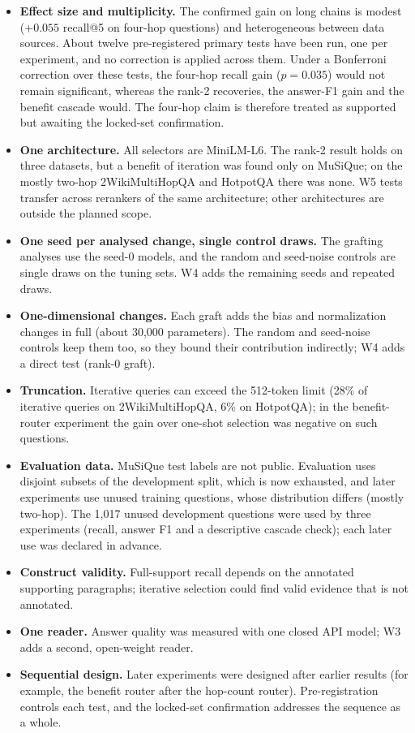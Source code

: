 \begin{itemize}
  \item \textbf{Effect size and multiplicity.} The confirmed gain on long chains is modest ($+0.055$ recall@5 on four-hop questions) and heterogeneous between data sources. About twelve pre-registered primary tests have been run, one per experiment, and no correction is applied across them. Under a Bonferroni correction over these tests, the four-hop recall gain ($p=0.035$) would not remain significant, whereas the rank-2 recoveries, the answer-F1 gain and the benefit cascade would. The four-hop claim is therefore treated as supported but awaiting the locked-set confirmation.
  \item \textbf{One architecture.} All selectors are MiniLM-L6. The rank-2 result holds on three datasets, but a benefit of iteration was found only on MuSiQue; on the mostly two-hop 2WikiMultiHopQA and HotpotQA there was none. W5 tests transfer across rerankers of the same architecture; other architectures are outside the planned scope.
  \item \textbf{One seed per analysed change, single control draws.} The grafting analyses use the seed-0 models, and the random and seed-noise controls are single draws on the tuning sets. W4 adds the remaining seeds and repeated draws.
  \item \textbf{One-dimensional changes.} Each graft adds the bias and normalization changes in full (about 30,000 parameters). The random and seed-noise controls keep them too, so they bound their contribution indirectly; W4 adds a direct test (rank-0 graft).
  \item \textbf{Truncation.} Iterative queries can exceed the 512-token limit (28\% of iterative queries on 2WikiMultiHopQA, 6\% on HotpotQA); in the benefit-router experiment the gain over one-shot selection was negative on such questions.
  \item \textbf{Evaluation data.} MuSiQue test labels are not public. Evaluation uses disjoint subsets of the development split, which is now exhausted, and later experiments use unused training questions, whose distribution differs (mostly two-hop). The 1,017 unused development questions were used by three experiments (recall, answer F1 and a descriptive cascade check); each later use was declared in advance.
  \item \textbf{Construct validity.} Full-support recall depends on the annotated supporting paragraphs; iterative selection could find valid evidence that is not annotated.
  \item \textbf{One reader.} Answer quality was measured with one closed API model; W3 adds a second, open-weight reader.
  \item \textbf{Sequential design.} Later experiments were designed after earlier results (for example, the benefit router after the hop-count router). Pre-registration controls each test, and the locked-set confirmation addresses the sequence as a whole.
\end{itemize}

